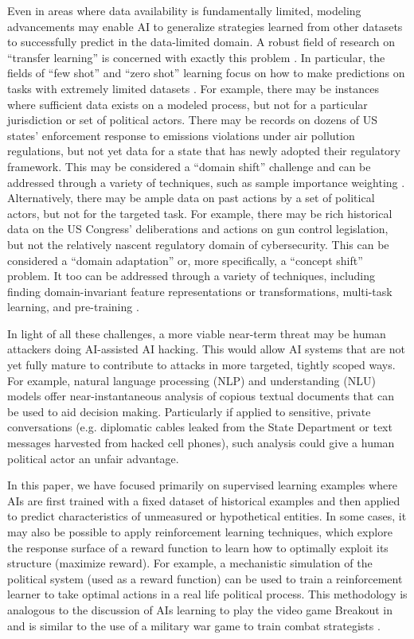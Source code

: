 \documentclass[nonacm,12pt]{acmart}
\begin{document}
Even in areas where data availability is fundamentally limited, modeling advancements may enable AI to generalize strategies learned from other datasets to successfully predict in the data-limited domain.  A robust field of research on ``transfer learning'' is concerned with exactly this problem \cite{kouw_introduction_2018}. In particular, the fields of ``few shot'' and ``zero shot'' learning focus on how to make predictions on tasks with extremely limited datasets \cite{xian_zero-shot_2019, wang_generalizing_2020}.  For example, there may be instances where sufficient data exists on a modeled process, but not for a particular jurisdiction or set of political actors.  There may be records on dozens of US states' enforcement response to emissions violations under air pollution regulations, but not yet data for a state that has newly adopted their regulatory framework.  This may be considered a ``domain shift'' challenge and can be addressed through a variety of techniques, such as sample importance weighting \cite{wang_balanced_2017}.  Alternatively, there may be ample data on past actions by a set of political actors, but not for the targeted task.  For example, there may be rich historical data on the US Congress' deliberations and actions on gun control legislation, but not the relatively nascent regulatory domain of cybersecurity. This can be considered a ``domain adaptation'' or, more specifically, a ``concept shift'' problem.  It too can be addressed through a variety of techniques, including finding domain-invariant feature representations or transformations, multi-task learning, and pre-training \cite{farahani_brief_2020, meftah_multi-task_2020}.  

In light of all these challenges, a more viable near-term threat may be human attackers doing AI-assisted AI hacking. This would allow AI systems that are not yet fully mature to contribute to attacks in more targeted, tightly scoped ways.
For example, natural language processing (NLP) and understanding (NLU) models offer near-instantaneous analysis of copious textual documents that can be used to aid decision making. 
Particularly if applied to sensitive, private conversations (e.g. diplomatic cables leaked from the State Department or text messages harvested from hacked cell phones), such analysis could give a human political actor an unfair advantage.

In this paper, we have focused primarily on supervised learning examples where AIs are first trained with a fixed dataset of historical examples and then applied to predict characteristics of unmeasured or hypothetical entities.  In some cases, it may also be possible to apply reinforcement learning techniques, which explore the response surface of a reward function to learn how to optimally exploit its structure (maximize reward). 
For example, a mechanistic simulation of the political system (used as a reward function) can be used to train a reinforcement learner to take optimal actions in a real life political process.  
This methodology is analogous to the discussion of AIs learning to play the video game Breakout in \citet{schneier_coming_2021} and is similar to the use of a military war game to train combat strategists \cite[e.g.,][]{parkin_game_2020}.
\end{document}
